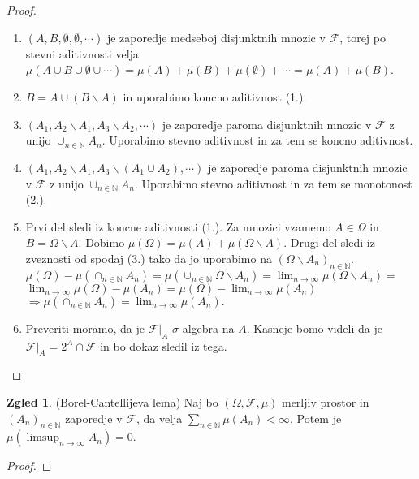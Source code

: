 \documentclass[a4paper,12pt]{article}
\theoremstyle{definition} %
\newtheorem{zgled}[definicija]{Zgled}
\theoremstyle{plain} %
\newcommand{\N}{\mathbb{N}}
\newcommand{\F}{\mathcal{F}}
\begin{document}
            \begin{proof}
                \begin{enumerate}
                    \item $\left(A, B, \emptyset, \emptyset, \cdots \right)$ je zaporedje medseboj disjunktnih mnozic v $\F$, torej po stevni aditivnosti velja $\mu(A \cup B \cup \emptyset \cup \cdots) = \mu(A) + \mu(B) + \mu(\emptyset) + \cdots = \mu(A) + \mu(B)$.
                    \item $B = A \cup (B \backslash A)$ in uporabimo koncno aditivnost (1.).
                    \item $\left(A_1, A_2\backslash A_1, A_3\backslash A_2, \cdots \right)$ je zaporedje paroma disjunktnih mnozic v $\F$ z unijo $\cup_{n \in \N}A_n$. Uporabimo stevno aditivnost in za tem se koncno aditivnost.
                    \item $\left(A_1, A_2\backslash A_1, A_3\backslash (A_1 \cup A_2), \cdots \right)$ je zaporedje paroma disjunktnih mnozic v $\F$ z unijo $\cup_{n \in \N}A_n$. Uporabimo stevno aditivnost in za tem se monotonost (2.).
                    \item Prvi del sledi iz koncne aditivnosti (1.). Za mnozici vzamemo $A \in \Omega$ in  $B = \Omega \backslash A$. Dobimo $\mu(\Omega) = \mu(A) + \mu(\Omega \backslash A)$. Drugi del sledi iz zveznosti od spodaj (3.) tako da jo uporabimo na $\left(\Omega\backslash A_n \right)_{n \in \N}$. $\mu(\Omega) - \mu(\cap_{n \in \N}A_n) = \mu\left( \cup_{n \in \N}\Omega\backslash A_n\right) = \lim_{n \rightarrow \infty}\mu(\Omega\backslash A_n) = $ $\lim_{n \rightarrow \infty}\mu(\Omega) - \mu(A_n) = \mu(\Omega) - \lim_{n \rightarrow \infty}\mu(A_n)$ $ \Rightarrow \mu(\cap_{n \in \N}A_n) = \lim_{n \rightarrow \infty}\mu(A_n).$
                    \item Preveriti moramo, da je $\F|_A$ $\sigma$-algebra na $A$. Kasneje bomo videli da je $\F|_A = 2^A \cap \F$ in bo dokaz sledil iz tega.
                \end{enumerate}
            \end{proof}

            \begin{zgled}(Borel-Cantellijeva lema)
                Naj bo $\left( \Omega, \F, \mu \right)$ merljiv prostor in $(A_n)_{n \in \N}$ zaporedje v $\F$, da velja $\sum_{n \in \N}\mu(A_n) < \infty$. Potem je $\mu(\limsup_{n \rightarrow \infty}A_n) = 0$.
            \end{zgled}

            \begin{proof}
                
            \end{proof}
\end{document}
